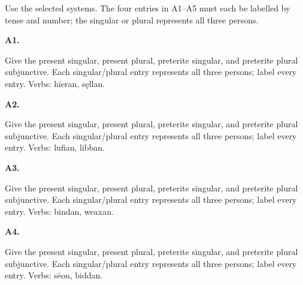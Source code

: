 Use the selected systems. The four entries in A1–A5 must each be labelled by tense and number; the singular or plural represents all three persons.

\par\begin{minipage}{\linewidth}\raggedright
\textbf{A1.}

Give the present singular, present plural, preterite singular, and preterite plural subjunctive. Each singular/\allowbreak{}plural entry represents all three persons; label every entry. Verbs: hīeran, sęllan.

\end{minipage}\par\addvspace{4pt}

\par\begin{minipage}{\linewidth}\raggedright
\textbf{A2.}

Give the present singular, present plural, preterite singular, and preterite plural subjunctive. Each singular/\allowbreak{}plural entry represents all three persons; label every entry. Verbs: lufian, libban.

\end{minipage}\par\addvspace{4pt}

\par\begin{minipage}{\linewidth}\raggedright
\textbf{A3.}

Give the present singular, present plural, preterite singular, and preterite plural subjunctive. Each singular/\allowbreak{}plural entry represents all three persons; label every entry. Verbs: bindan, weaxan.

\end{minipage}\par\addvspace{4pt}

\par\begin{minipage}{\linewidth}\raggedright
\textbf{A4.}

Give the present singular, present plural, preterite singular, and preterite plural subjunctive. Each singular/\allowbreak{}plural entry represents all three persons; label every entry. Verbs: sēon, biddan.

\end{minipage}\par\addvspace{4pt}

